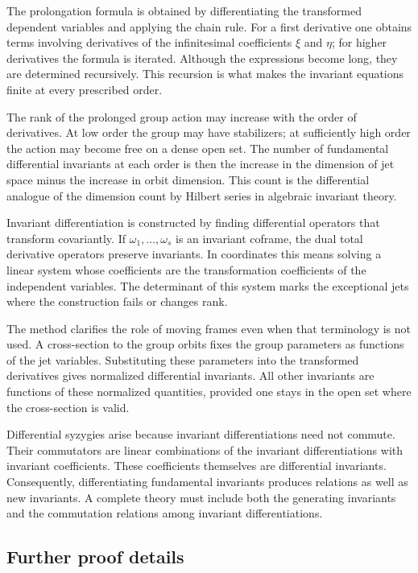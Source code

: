 \documentclass[12pt]{article}
\begin{document}
The prolongation formula is obtained by differentiating the transformed dependent variables and
applying the chain rule. For a first derivative one obtains terms involving derivatives of the
infinitesimal coefficients \(\xi\) and \(\eta\); for higher derivatives the formula is iterated.
Although the expressions become long, they are determined recursively. This recursion is what makes
the invariant equations finite at every prescribed order.

The rank of the prolonged group action may increase with the order of derivatives. At low order the
group may have stabilizers; at sufficiently high order the action may become free on a dense open
set. The number of fundamental differential invariants at each order is then the increase in the
dimension of jet space minus the increase in orbit dimension. This count is the differential
analogue of the dimension count by Hilbert series in algebraic invariant theory.

Invariant differentiation is constructed by finding differential operators that transform
covariantly. If \(\omega_1,\ldots,\omega_s\) is an invariant coframe, the dual total derivative
operators preserve invariants. In coordinates this means solving a linear system whose coefficients
are the transformation coefficients of the independent variables. The determinant of this system
marks the exceptional jets where the construction fails or changes rank.

The method clarifies the role of moving frames even when that terminology is not used. A
cross-section to the group orbits fixes the group parameters as functions of the jet variables.
Substituting these parameters into the transformed derivatives gives normalized differential
invariants. All other invariants are functions of these normalized quantities, provided one stays in
the open set where the cross-section is valid.

Differential syzygies arise because invariant differentiations need not commute. Their commutators
are linear combinations of the invariant differentiations with invariant coefficients. These
coefficients themselves are differential invariants. Consequently, differentiating fundamental
invariants produces relations as well as new invariants. A complete theory must include both the
generating invariants and the commutation relations among invariant differentiations.


\subsection{Further proof details}
\end{document}
